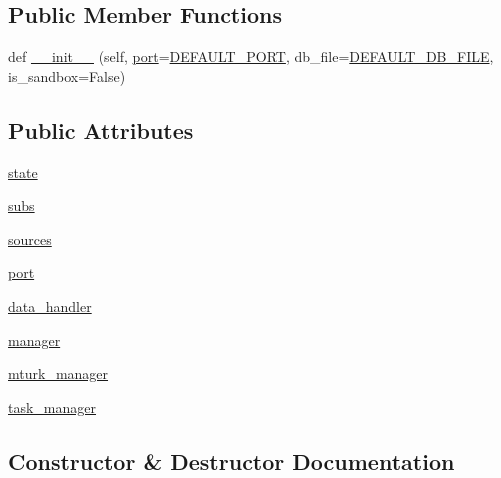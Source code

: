 \subsection*{Public Member Functions}
\begin{DoxyCompactItemize}
\item 
def \hyperlink{classparlai_1_1mturk_1_1webapp_1_1server_1_1Application_a0c8d2d2d9418e9654a734ccef5a09942}{\+\_\+\+\_\+init\+\_\+\+\_\+} (self, \hyperlink{classparlai_1_1mturk_1_1webapp_1_1server_1_1Application_a206b0e1b1cea8274f21a0ce980d76dfb}{port}=\hyperlink{namespaceparlai_1_1mturk_1_1webapp_1_1server_ab2dbe49416f69522010b6c9a211af0e3}{D\+E\+F\+A\+U\+L\+T\+\_\+\+P\+O\+RT}, db\+\_\+file=\hyperlink{namespaceparlai_1_1mturk_1_1webapp_1_1server_a7d1b65251987c39df64aeb32f36f6a9f}{D\+E\+F\+A\+U\+L\+T\+\_\+\+D\+B\+\_\+\+F\+I\+LE}, is\+\_\+sandbox=False)
\end{DoxyCompactItemize}
\subsection*{Public Attributes}
\begin{DoxyCompactItemize}
\item 
\hyperlink{classparlai_1_1mturk_1_1webapp_1_1server_1_1Application_a9280c9b9e3b934c9da7381a2bc04c867}{state}
\item 
\hyperlink{classparlai_1_1mturk_1_1webapp_1_1server_1_1Application_a093ceb0dda80a2cf6695111161e112b2}{subs}
\item 
\hyperlink{classparlai_1_1mturk_1_1webapp_1_1server_1_1Application_afb5154a1ef04c2c2efd4e9b710b9b848}{sources}
\item 
\hyperlink{classparlai_1_1mturk_1_1webapp_1_1server_1_1Application_a206b0e1b1cea8274f21a0ce980d76dfb}{port}
\item 
\hyperlink{classparlai_1_1mturk_1_1webapp_1_1server_1_1Application_a73c29eb37d95de2143d81d7cdb775417}{data\+\_\+handler}
\item 
\hyperlink{classparlai_1_1mturk_1_1webapp_1_1server_1_1Application_ae55f819d9aa679ede302ea8931b35642}{manager}
\item 
\hyperlink{classparlai_1_1mturk_1_1webapp_1_1server_1_1Application_afef729389279805c83048d79d5de7d9f}{mturk\+\_\+manager}
\item 
\hyperlink{classparlai_1_1mturk_1_1webapp_1_1server_1_1Application_a7ad5b113a0889b6dfef99e168cb0b69f}{task\+\_\+manager}
\end{DoxyCompactItemize}


\subsection{Constructor \& Destructor Documentation}
\mbox{\label{classparlai_1_1mturk_1_1webapp_1_1server_1_1Application_a0c8d2d2d9418e9654a734ccef5a09942}} 
